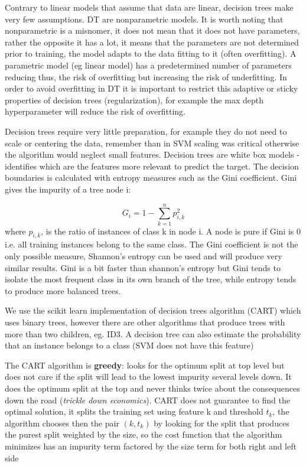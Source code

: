 \documentclass[11pt]{article}
\begin{document}
Contrary to linear models that assume that data are linear, decision trees make very few assumptions.
DT are nonparametric models. It is worth noting that nonparametric is a misnomer, it does not mean that it does not have parameters, rather the opposite it has a lot, it means that the parameters are not determined prior to training, the model adapts to the data fitting to it (often overfitting). A parametric model (eg linear model) has a predetermined number of parameters reducing thus, the risk of overfitting but increasing the risk of underfitting. In order to avoid overfitting in DT it is important to restrict this adaptive or sticky properties of decision trees (regularization), for example the max depth hyperparameter will reduce the risk of overfitting.

Decision trees require very little preparation, for example they do not need to scale or centering the data, remember than in SVM scaling was critical otherwise the algorithm would neglect small features.
Decision trees are white box models -identifies which are the features more relevant to predict the target.
The decision boundaries is calculated with entropy measures such as the Gini coefficient. Gini gives the impurity of a tree node i:

\begin{equation} \label{eq:gini}
G_i = 1- \sum_{k=1}^{n} p_{i,k}^2
\end{equation}
where $p_{i,k}$, is the ratio of instances of class k in node i. A node is pure if Gini is 0 i.e. all training instances belong to the same class. The Gini coefficient is not the only possible measure, Shannon's entropy can be used and will produce very similar results. Gini is a bit faster than shannon's entropy but Gini tends to isolate the most frequent class in its own branch of the tree, while entropy tends to produce more balanced trees. %

We use the scikit learn implementation of decision trees algorithm (CART) which uses binary trees, however there are other algorithms that produce trees with more than two children, eg. ID3.
A decision tree can also estimate the probability that an instance belongs to a class (SVM does not have this feature)

The CART algorithm is \textbf{greedy}: looks for the optimum split at top level but does not care if the split will lead to the lowest impurity several levels down. It does the optimum split at the top and never thinks twice about the consequences down the road (\emph{trickle down economics}). CART does not guarantee to find the optimal solution, it splits the training set using feature k and threshold $t_k$, the algorithm chooses then the pair $(k,t_k)$ by looking for the split that produces the purest split weighted by the size, so the cost function that the algorithm minimizes has an impurity term factored by the size term for both right and left side 
\end{document}
